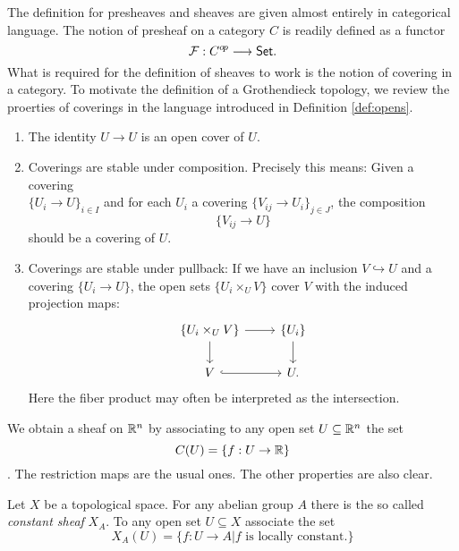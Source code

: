 The definition for presheaves and sheaves are given almost entirely in categorical language. The notion of presheaf on a category $C$ is readily defined as a functor 
\[\mathcal{F}: C^{o\kern-0.10em p}\longrightarrow \mathsf{Set}.\]
What is required for the definition of sheaves to work is the notion of covering in a category. To motivate the definition of a Grothendieck topology, we review the proerties of coverings in the language introduced in Definition \ref{def:opens}.
 \begin{enumerate}
  \item The identity $U \to U$ is an open cover of $U$.
  \item Coverings are stable under composition. Precisely this means: Given a covering \\$\{U_i \to U\}_{i \in I}$ and for each $U_i$ a covering $\{V_{ij} \to U_i\}_{j \in J}$, the composition
        \[\{V_{ij} \to U\}\]
        should be a covering of $U$.
   \item  Coverings are stable under pullback: If we have an inclusion $V \hookrightarrow U$ and a covering $\{U_i \to U\}$, the open sets $\{U_i \times_U V\}$ cover $V$ with the induced projection maps:
      \[\begin{tikzcd}
      	{\{U_i \times_U V\}} & {\{U_i\}} \\
      	V & U.
      	\arrow[from=1-1, to=2-1]
      	\arrow[from=1-1, to=1-2]
      	\arrow[from=1-2, to=2-2]
      	\arrow[hook, from=2-1, to=2-2]
      \end{tikzcd}\]
      Here the fiber product may often be interpreted as the intersection.
\end{enumerate}
\begin{definition}
  
\end{definition}

\begin{example}
  We obtain a sheaf on $\mathbb{R}^n$ by associating to any open set $U\subseteq \mathbb{R}^n$ the set \[C(U) = \{f: U \to \mathbb{R}\}\]. The restriction maps are the usual ones. The other properties are also clear.
\end{example}
\begin{example}
  Let $X$ be a topological space. For any abelian group $A$ there is the so called \textit{constant sheaf} $X_A$. To any open set $U \subseteq X$ associate the set \[X_A(U) = \{f: U \to A | f \text{ is locally constant.} \}\]
\end{example}

